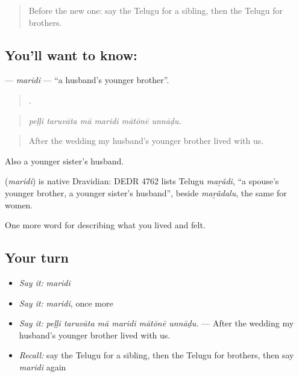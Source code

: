 \label{lesson:TE-C528-maridi}



\begin{quote}
Before the new one: say the Telugu for a sibling, then the Telugu for brothers.
\end{quote}

\subsection*{You'll want to know: }
\textbf{} — \emph{maridi} — \textquotedblleft{}a husband's younger brother\textquotedblright{}.

\begin{quote}
     .
\end{quote}

\begin{quote}
\emph{peḷḷi taruvāta mā maridi mātōnē unnāḍu.}
\end{quote}

\begin{quote}
After the wedding my husband's younger brother lived with us.
\end{quote}

Also a younger sister's husband.

\begin{cousinweb}
\textbf{} (\emph{maridi}) is native Dravidian: DEDR 4762 lists Telugu \emph{maṟãdi}, \textquotedblleft{}a spouse's younger brother, a younger sister's husband\textquotedblright{}, beside \emph{maṟãdalu}, the same for women.
\end{cousinweb}

\begin{grammarlens}[title={What you've built}]
One more word for describing what you lived and felt.
\end{grammarlens}

\subsection*{Your turn}
\begin{itemize}
\raggedright
  \item \emph{Say it:} \emph{maridi}
  \item \emph{Say it:} \emph{maridi}, once more
  \item \emph{Say it:} \emph{peḷḷi taruvāta mā maridi mātōnē unnāḍu.} — After the wedding my husband's younger brother lived with us.
  \item \emph{Recall:} say the Telugu for a sibling, then the Telugu for brothers, then say \emph{maridi} again
\end{itemize}

